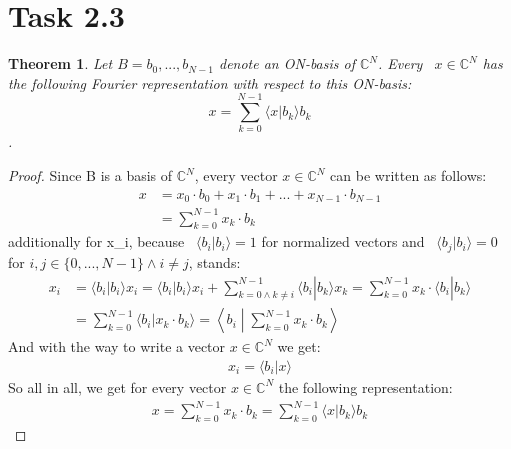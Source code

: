 \documentclass[12pt]{article}
\newcommand{\C}{\mathbb{C}}
\newtheorem{thm}{Theorem}
\begin{document}
 \section*{Task 2.3}
 \begin{thm} Let $B = b_0,...,b_{N-1}$ denote an ON-basis of $\C^{N}$. Every ~$x \in \C^N$ has the following Fourier representation with respect to this ON-basis:
 $$x = \sum_{k=0}^{N-1} \langle x | b_k \rangle b_k$$.\end{thm}
 \begin{proof}
   Since B is a basis of $\C^N$, every vector $x \in \C^N$ can be written as follows:
   \begin{align*}
     x &= x_0 \cdot b_0 + x_1 \cdot b_1 + ... + x_{N-1} \cdot b_{N-1}\\
     &= \sum_{k=0}^{N-1}x_k \cdot b_k
   \end{align*}
   additionally for x_i, because ~$\langle b_i | b_i \rangle = 1$  for normalized vectors  and ~$\langle b_j | b_i \rangle = 0$ for $i,j \in \{0,...,N-1\} \wedge i \neq j$, stands:
   \begin{align*}
     x_i &= \langle b_i | b_i \rangle x_i = \langle b_i | b_i \rangle x_i + \sum_{k=0 \wedge k \neq i}^{N-1}\langle b_i | b_k \rangle x_k = 
      \sum_{k=0}^{N-1}x_k \cdot \langle b_i | b_k \rangle \\
     &= \sum_{k=0}^{N-1}\langle b_i | x_k \cdot b_k \rangle = \left\langle  b_i \middle | \sum_{k=0}^{N-1} x_k \cdot b_k \right\rangle
   \end{align*}
   And with the way to write a vector $x \in \C^N$ we get:
   \begin{align*}
     x_i = \langle b_i | x \rangle
   \end{align*}
   So all in all, we get for every vector $x \in \C^N$ the following representation:
   \begin{align*}
     x = \sum_{k=0}^{N-1}x_k \cdot b_k =  \sum_{k=0}^{N-1} \langle x | b_k \rangle b_k
   \end{align*}
 \end{proof}
\end{document}
